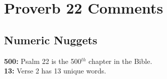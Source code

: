 \section{Proverb 22 Comments}

\subsection{Numeric Nuggets}
\textbf{500: } Psalm 22 is the 500$^{th}$ chapter in the Bible.\\
\noindent \textbf{13:} Verse 2 has 13 unique words.
